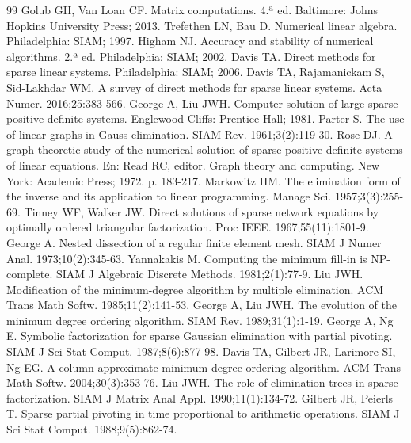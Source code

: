 \documentclass[11pt,a4paper]{article}
\begin{document}
\begin{thebibliography}{99}\small
{} Golub GH, Van Loan CF. Matrix computations. 4.ª ed. Baltimore: Johns Hopkins University Press; 2013.
 Trefethen LN, Bau D. Numerical linear algebra. Philadelphia: SIAM; 1997.
 Higham NJ. Accuracy and stability of numerical algorithms. 2.ª ed. Philadelphia: SIAM; 2002.
 Davis TA. Direct methods for sparse linear systems. Philadelphia: SIAM; 2006.
 Davis TA, Rajamanickam S, Sid-Lakhdar WM. A survey of direct methods for sparse linear systems. Acta Numer. 2016;25:383-566.
 George A, Liu JWH. Computer solution of large sparse positive definite systems. Englewood Cliffs: Prentice-Hall; 1981.
 Parter S. The use of linear graphs in Gauss elimination. SIAM Rev. 1961;3(2):119-30.
 Rose DJ. A graph-theoretic study of the numerical solution of sparse positive definite systems of linear equations. En: Read RC, editor. Graph theory and computing. New York: Academic Press; 1972. p. 183-217.
 Markowitz HM. The elimination form of the inverse and its application to linear programming. Manage Sci. 1957;3(3):255-69.
 Tinney WF, Walker JW. Direct solutions of sparse network equations by optimally ordered triangular factorization. Proc IEEE. 1967;55(11):1801-9.
 George A. Nested dissection of a regular finite element mesh. SIAM J Numer Anal. 1973;10(2):345-63.
 Yannakakis M. Computing the minimum fill-in is NP-complete. SIAM J Algebraic Discrete Methods. 1981;2(1):77-9.
 Liu JWH. Modification of the minimum-degree algorithm by multiple elimination. ACM Trans Math Softw. 1985;11(2):141-53.
 George A, Liu JWH. The evolution of the minimum degree ordering algorithm. SIAM Rev. 1989;31(1):1-19.
 George A, Ng E. Symbolic factorization for sparse Gaussian elimination with partial pivoting. SIAM J Sci Stat Comput. 1987;8(6):877-98.
 Davis TA, Gilbert JR, Larimore SI, Ng EG. A column approximate minimum degree ordering algorithm. ACM Trans Math Softw. 2004;30(3):353-76.
 Liu JWH. The role of elimination trees in sparse factorization. SIAM J Matrix Anal Appl. 1990;11(1):134-72.
 Gilbert JR, Peierls T. Sparse partial pivoting in time proportional to arithmetic operations. SIAM J Sci Stat Comput. 1988;9(5):862-74.

\end{thebibliography}
\end{document}
